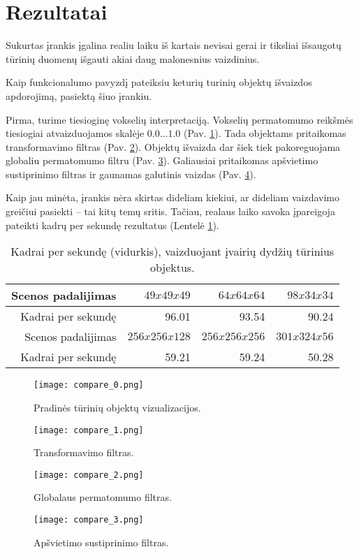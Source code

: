 \section{Rezultatai}

Sukurtas įrankis įgalina realiu laiku iš kartais nevisai gerai ir tiksliai
išsaugotų tūrinių duomenų išgauti akiai daug malonesnius vaizdinius.

Kaip funkcionalumo pavyzdį pateiksiu keturių turinių objektų išvaizdos
apdorojimą, pasiektą šiuo įrankiu.

Pirma, turime tiesioginę vokselių interpretaciją. Vokselių permatomumo
reikšmės tiesiogiai atvaizduojamos skalėje $0.0 \ldots 1.0$ (Pav.
\ref{fig:compare_0}). Tada objektams pritaikomas transformavimo filtras (Pav.
\ref{fig:compare_1}). Objektų išvaizda dar šiek tiek pakoreguojama globaliu
permatomumo filtru (Pav. \ref{fig:compare_2}). Galiausiai pritaikomas
apšvietimo sustiprinimo filtras ir gaunamas galutinis vaizdas (Pav.
\ref{fig:compare_3}).

Kaip jau minėta, įrankis nėra skirtas dideliam kiekiui, ar dideliam
vaizdavimo greičiui pasiekti -- tai kitų temų sritis. Tačiau, realaus laiko
savoka įpareigoja pateikti kadrų per sekundę rezultatus
(Lentelė \ref{tab:fps}).

\begin{table}[!ht]
\centering
  \begin{tabular}{ | r | r | r | r | }
  \cline{1-4}
  Scenos padalijimas    &     $49x49x49$ &    $64x64x64$ & $98x34x34$   \\ \hline
  Kadrai per sekundę    &          96.01 &         93.54 &      90.24   \\ \hline
  Scenos padalijimas    &  $256x256x128$ & $256x256x256$ & $301x324x56$ \\ \hline
  Kadrai per sekundę    &          59.21 &         59.24 &        50.28 \\ \hline
  \end{tabular}
\caption{Kadrai per sekundę (vidurkis), vaizduojant įvairių dydžių tūrinius objektus. }
\label{tab:fps}
\end{table}

\begin{figure}[b]
\centering
\texttt{[image: compare\_0.png]}
\caption{Pradinės tūrinių objektų vizualizacijos.}
\label{fig:compare_0}
\end{figure}

\begin{figure}[b]
\centering
\texttt{[image: compare\_1.png]}
\caption{Transformavimo filtras.}
\label{fig:compare_1}
\end{figure}

\begin{figure}[b]
\centering
\texttt{[image: compare\_2.png]}
\caption{Globalaus permatomumo filtras.}
\label{fig:compare_2}
\end{figure}

\begin{figure}[b]
\centering
\texttt{[image: compare\_3.png]}
\caption{Apšvietimo sustiprinimo filtras.}
\label{fig:compare_3}
\end{figure}

